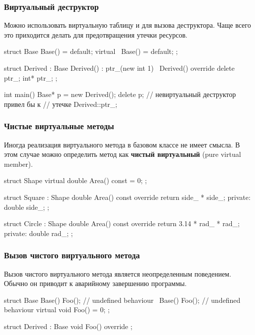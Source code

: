 \documentclass[compress, 8pt, aspectratio=169]{beamer}
\begin{document}
\begin{frame}[fragile]

    \frametitle{Виртуальный деструктор}

    \hfill\break
    Можно использовать виртуальную таблицу и для вызова деструктора.
    Чаще всего это приходится делать для предотвращения утечки ресурсов\footnotemark{}.


    \begin{myinplacelisting}[minted language=cpp]
struct Base {
    Base() = default;
    virtual ~Base() = default;
};

struct Derived : Base {
    Derived() : ptr_(new int {1}) {}
    ~Derived() override { delete ptr_; }
    int* ptr_;
};

int main() {
    Base* p = new Derived();
    delete p; // невиртуальный деструктор привел бы к
              // утечке Derived::ptr_;
}
    \end{myinplacelisting}

\end{frame}

\begin{frame}[fragile]

    \frametitle{Чистые виртуальные методы}

    \hfill\break
    Иногда реализация виртуального метода в базовом классе не имеет смысла.
    В этом случае можно определить метод как \textbf{чистый виртуальный}\footnotemark{}
    (pure virtual member).


    \begin{myinplacelisting}[minted language=cpp]
struct Shape {
    virtual double Area() const = 0;
};

struct Square : Shape {
    double Area() const override
        { return side_ * side_; }
private:
    double side_;
};

struct Circle : Shape {
    double Area() const override
        { return 3.14 * rad_ * rad_; }
private:
    double rad_;
};
    \end{myinplacelisting}

\end{frame}

\begin{frame}[fragile]

    \frametitle{Вызов чистого виртуального метода}

    \hfill\break
    Вызов чистого виртуального метода является неопределенным поведением.
    Обычно он приводит к аварийному завершению программы.

    \begin{myinplacelisting}[minted language=cpp]
struct Base {
    Base() { Foo(); } // undefined behaviour
    ~Base() { Foo(); } // undefined behaviour
    virtual void Foo() = 0;
};

struct Derived : Base {
    void Foo() override {}
};
    \end{myinplacelisting}

\end{frame}
\end{document}
